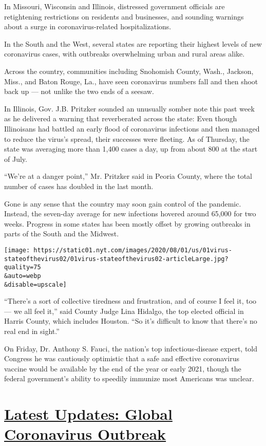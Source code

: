 In Missouri, Wisconsin and Illinois, distressed government officials are
retightening restrictions on residents and businesses, and sounding
warnings about a surge in coronavirus-related hospitalizations.

In the South and the West, several states are reporting their highest
levels of new coronavirus cases, with outbreaks overwhelming urban and
rural areas alike.

Across the country, communities including Snohomish County, Wash.,
Jackson, Miss., and Baton Rouge, La., have seen coronavirus numbers fall
and then shoot back up --- not unlike the two ends of a seesaw.

In Illinois, Gov. J.B. Pritzker sounded an unusually somber note this
past week as he delivered a warning that reverberated across the state:
Even though Illinoisans had battled an early flood of coronavirus
infections and then managed to reduce the virus's spread, their
successes were fleeting. As of Thursday, the state was averaging more
than 1,400 cases a day, up from about 800 at the start of July.

``We're at a danger point,'' Mr. Pritzker said in Peoria County, where
the total number of cases has doubled in the last month.

Gone is any sense that the country may soon gain control of the
pandemic. Instead, the seven-day average for new infections hovered
around 65,000 for two weeks. Progress in some states has been mostly
offset by growing outbreaks in parts of the South and the Midwest.

\texttt{[image: https://static01.nyt.com/images/2020/08/01/us/01virus-stateofthevirus02/01virus-stateofthevirus02-articleLarge.jpg?quality=75\\\&auto=webp\\\&disable=upscale]}

``There's a sort of collective tiredness and frustration, and of course
I feel it, too --- we all feel it,'' said County Judge Lina Hidalgo, the
top elected official in Harris County, which includes Houston. ``So it's
difficult to know that there's no real end in sight.''

On Friday, Dr. Anthony S. Fauci, the nation's top infectious-disease
expert, told Congress he was cautiously optimistic that a safe and
effective coronavirus vaccine would be available by the end of the year
or early 2021, though the federal government's ability to speedily
immunize most Americans was unclear.

\hypertarget{latest-updates-global-coronavirus-outbreak}{%
\section{\texorpdfstring{\href{https://www.nytimes.com/2020/08/01/world/coronavirus-covid-19.html?action=click\&pgtype=Article\&state=default\&region=MAIN_CONTENT_1\&context=storylines_live_updates}{Latest
Updates: Global Coronavirus
Outbreak}}{Latest Updates: Global Coronavirus Outbreak}}\label{latest-updates-global-coronavirus-outbreak}}


